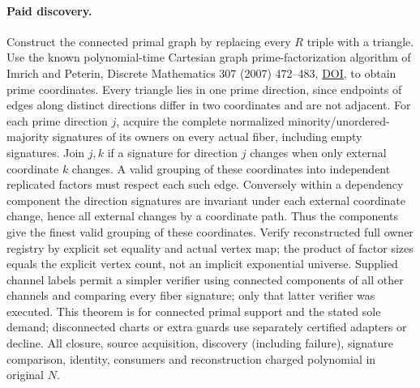 \documentclass[11pt]{article}
\begin{document}
\paragraph{Paid discovery.} Construct the connected primal graph by replacing every \(R\) triple with a triangle. Use the known polynomial-time Cartesian graph prime-factorization algorithm of Imrich and Peterin, Discrete Mathematics 307 (2007) 472--483, \href{https://doi.org/10.1016/j.disc.2005.09.038}{DOI}, to obtain prime coordinates. Every triangle lies in one prime direction, since endpoints of edges along distinct directions differ in two coordinates and are not adjacent. For each prime direction \(j\), acquire the complete normalized minority/unordered-majority signatures of its owners on every actual fiber, including empty signatures. Join \(j,k\) if a signature for direction \(j\) changes when only external coordinate \(k\) changes. A valid grouping of these coordinates into independent replicated factors must respect each such edge. Conversely within a dependency component the direction signatures are invariant under each external coordinate change, hence all external changes by a coordinate path. Thus the components give the finest valid grouping of these coordinates. Verify reconstructed full owner registry by explicit set equality and actual vertex map; the product of factor sizes equals the explicit vertex count, not an implicit exponential universe. Supplied channel labels permit a simpler verifier using connected components of all other channels and comparing every fiber signature; only that latter verifier was executed. This theorem is for connected primal support and the stated sole demand; disconnected charts or extra guards use separately certified adapters or decline. All closure, source acquisition, discovery (including failure), signature comparison, identity, consumers and reconstruction charged polynomial in original \(N\).
\end{document}
